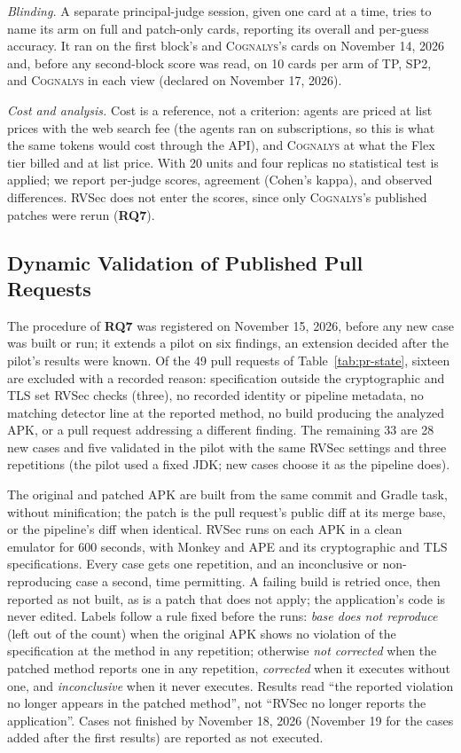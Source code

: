 \documentclass[conference]{IEEEtran}
\newcommand{\system}{\textsc{Cognalys}}
\newcommand{\researchq}[1]{\textbf{RQ#1}}
\begin{document}
\emph{Blinding.} A separate principal-judge session, given one card at a
time, tries to name its arm on full and patch-only cards, reporting its
overall and per-guess accuracy. It ran on the first block's and {\system}'s
cards on November 14, 2026 and, before any second-block score was read, on 10
cards per arm of TP, SP2, and {\system} in each view (declared on
November 17, 2026).

\emph{Cost and analysis.} Cost is a reference, not a criterion: agents are
priced at list prices with the web search fee (the agents ran on subscriptions,
so this is what the same tokens would cost through the API), and {\system} at what the
Flex tier billed and at list price. With 20 units and four replicas no
statistical test is applied; we report per-judge scores, agreement (Cohen's
kappa), and observed differences. RVSec does not enter the scores, since only
{\system}'s published patches were rerun (\researchq{7}).

\subsection{Dynamic Validation of Published Pull Requests}
\label{subsec:dynval}

The procedure of \researchq{7} was registered on November 15, 2026, before any
new case was built or run; it extends a pilot on six findings, an extension
decided after the pilot's results were known. Of the 49 pull requests of
Table~\ref{tab:pr-state}, sixteen are excluded with a recorded reason:
specification outside the cryptographic and TLS set RVSec checks (three), no
recorded identity or pipeline metadata, no matching detector line at the
reported method, no build producing the analyzed APK, or a pull request
addressing a different finding. The remaining 33 are 28 new cases and five
validated in the pilot with the same RVSec settings and three repetitions
(the pilot used a fixed JDK; new cases choose it as the pipeline does).

The original and patched APK are built from the same commit and Gradle task,
without minification; the patch is the pull request's public diff at its
merge base, or the pipeline's diff when identical. RVSec runs on each APK in a
clean emulator for 600 seconds, with Monkey and APE and its cryptographic and
TLS specifications. Every case gets one repetition, and an inconclusive or
non-reproducing case a second, time permitting. A failing build is retried
once, then reported as not built, as is a patch that does not apply; the
application's code is never edited. Labels follow a rule fixed before the
runs: \emph{base does not reproduce} (left out of the count) when the original
APK shows no violation of the specification at the method in any repetition;
otherwise \emph{not corrected} when the patched method reports one in any
repetition, \emph{corrected} when it executes without one, and
\emph{inconclusive} when it never executes. Results read ``the reported
violation no longer appears in the patched method'', not ``RVSec no longer
reports the application''. Cases not finished by November 18, 2026
(November 19 for the cases added after the first results) are reported as not
executed.
\end{document}
